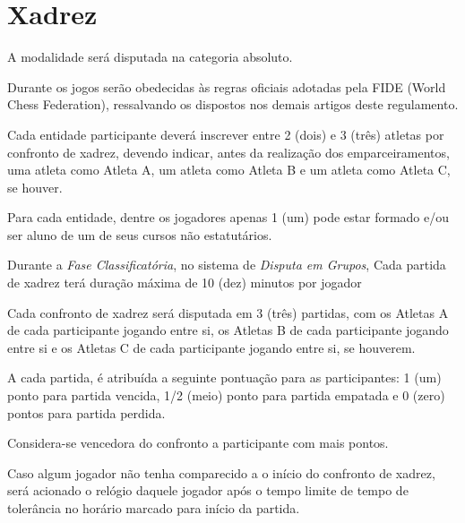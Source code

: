 {\let\clearpage\relax \chapter{Xadrez}}

\begin{article}
	A modalidade será disputada na categoria absoluto.
\end{article}

\begin{article}
	Durante os jogos serão obedecidas às regras oficiais adotadas pela FIDE (World Chess Federation), ressalvando os dispostos nos demais artigos deste regulamento.
\end{article}

\begin{article}
	Cada entidade participante deverá inscrever entre 2 (dois) e 3 (três) atletas por confronto de xadrez, devendo indicar, antes da realização dos emparceiramentos, uma atleta como Atleta A, um atleta como Atleta B e um atleta como Atleta C, se houver.
	
	\begin{xparagraph}
	    Para cada entidade, dentre os jogadores apenas 1 (um) pode estar formado e/ou ser aluno de um de seus cursos não estatutários.
	\end{xparagraph}
\end{article}

\begin{article}
	Durante a \textit{Fase Classificatória}, no sistema de \textit{Disputa em Grupos}, Cada partida de xadrez terá duração máxima de 10 (dez) minutos por jogador
\end{article}

\begin{article}
	Cada confronto de xadrez será disputada em 3 (três) partidas, com os Atletas A de cada participante jogando entre si, os Atletas B de cada participante jogando entre si e os Atletas C de cada participante jogando entre si, se houverem.

	\begin{xparagraph}
		A cada partida, é atribuída a seguinte pontuação para as participantes: 1 (um) ponto para partida vencida, 1/2 (meio) ponto para partida empatada e 0 (zero) pontos para partida perdida.
	\end{xparagraph}

	\begin{xparagraph}
		Considera-se vencedora do confronto a participante com mais pontos.
	\end{xparagraph}

	\begin{xparagraph}
		Caso algum jogador não tenha comparecido a o início do confronto de xadrez, será acionado o relógio daquele jogador após o tempo limite de tempo de tolerância no horário marcado para início da partida.
	\end{xparagraph}
\end{article}

